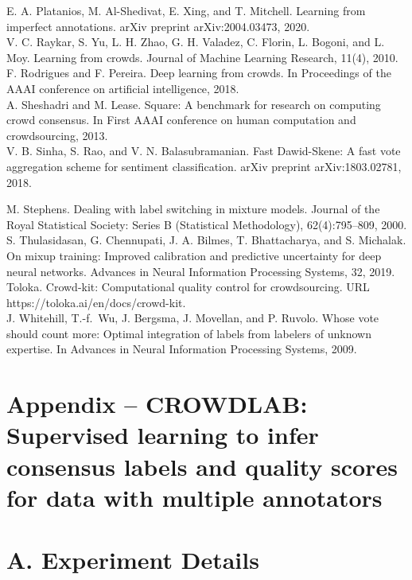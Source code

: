 \documentclass[
]{article}
\begin{document}
E. A. Platanios, M. Al-Shedivat, E. Xing, and T. Mitchell. Learning from
imperfect annotations. arXiv preprint arXiv:2004.03473, 2020.\\
V. C. Raykar, S. Yu, L. H. Zhao, G. H. Valadez, C. Florin, L. Bogoni,
and L. Moy. Learning from crowds. Journal of Machine Learning Research,
11(4), 2010.\\
F. Rodrigues and F. Pereira. Deep learning from crowds. In Proceedings
of the AAAI conference on artificial intelligence, 2018.\\
A. Sheshadri and M. Lease. Square: A benchmark for research on computing
crowd consensus. In First AAAI conference on human computation and
crowdsourcing, 2013.\\
V. B. Sinha, S. Rao, and V. N. Balasubramanian. Fast Dawid-Skene: A fast
vote aggregation scheme for sentiment classification. arXiv preprint
arXiv:1803.02781, 2018.

M. Stephens. Dealing with label switching in mixture models. Journal of
the Royal Statistical Society: Series B (Statistical Methodology),
62(4):795--809, 2000.\\
S. Thulasidasan, G. Chennupati, J. A. Bilmes, T. Bhattacharya, and S.
Michalak. On mixup training: Improved calibration and predictive
uncertainty for deep neural networks. Advances in Neural Information
Processing Systems, 32, 2019.\\
Toloka. Crowd-kit: Computational quality control for crowdsourcing. URL
https://toloka.ai/en/docs/crowd-kit.\\
J. Whitehill, T.-f.~Wu, J. Bergsma, J. Movellan, and P. Ruvolo. Whose
vote should count more: Optimal integration of labels from labelers of
unknown expertise. In Advances in Neural Information Processing Systems,
2009.

\section{Appendix -- CROWDLAB: Supervised learning to infer consensus
labels and quality scores for data with multiple
annotators}\label{appendix-crowdlab-supervised-learning-to-infer-consensus-labels-and-quality-scores-for-data-with-multiple-annotators}

\section{A. Experiment Details}\label{a.-experiment-details}
\end{document}
